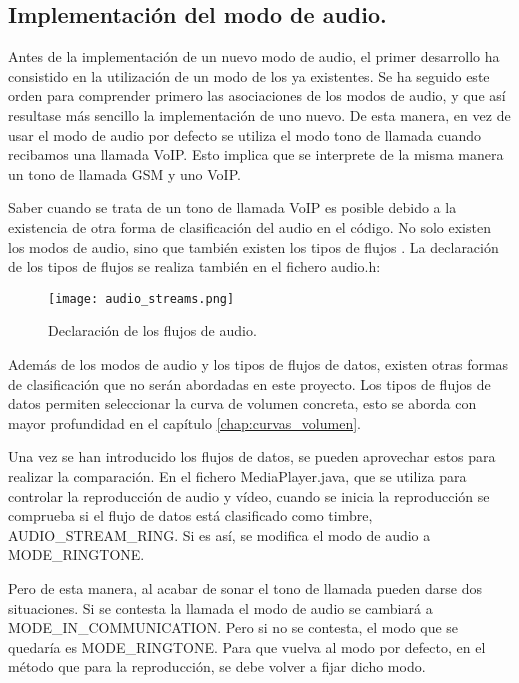 \subsection{Implementación del modo de audio.}\label{sec:nuevo_modo}
Antes de la implementación de un nuevo modo de audio, el primer desarrollo ha consistido en la utilización de un modo de los ya existentes. Se ha seguido este orden para comprender primero las asociaciones de los modos de audio, y que así resultase más sencillo la implementación de uno nuevo. De esta manera, en vez de usar el modo de audio por defecto se utiliza el modo tono de llamada cuando recibamos una llamada \gls{VoIP}. Esto implica que se interprete de la misma manera un tono de llamada \gls{GSM} y uno \gls{VoIP}.

Saber cuando se trata de un tono de llamada \gls{VoIP} es posible debido a la existencia de otra forma de clasificación del audio en el código. No solo existen los modos de audio, sino que también existen los tipos de flujos \cite{audio_manager}. La declaración de los tipos de flujos se realiza también en el fichero audio.h:

\begin{figure}[H]
	\centering
	\texttt{[image: audio\_streams.png]}
	\caption{Declaración de los flujos de audio.}
	\label{fig:audio_streams}
\end{figure}

Además de los modos de audio y los tipos de flujos de datos, existen otras formas de clasificación que no serán abordadas en este proyecto. Los tipos de flujos de datos permiten seleccionar la curva de volumen concreta, esto se aborda con mayor profundidad en el capítulo \ref{chap:curvas_volumen}.

Una vez se han introducido los flujos de datos, se pueden aprovechar estos para realizar la comparación.  En el fichero MediaPlayer.java, que se utiliza para controlar la reproducción de audio y vídeo, cuando se inicia la reproducción se comprueba si el flujo de datos está clasificado como timbre, AUDIO\_STREAM\_RING. Si es así, se modifica el modo de audio a MODE\_RINGTONE.

Pero de esta manera, al acabar de sonar el tono de llamada pueden darse dos situaciones. Si se contesta la llamada el modo de audio se cambiará a \\ MODE\_IN\_COMMUNICATION. Pero si no se contesta, el modo que se quedaría es MODE\_RINGTONE. Para que vuelva al modo por defecto, en el método que para la reproducción, se debe volver a fijar dicho modo.

